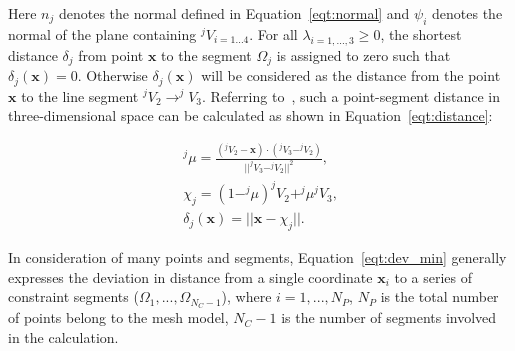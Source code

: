 Here $n_j$ denotes the normal defined in Equation~\ref{eqt:normal} and $\psi_i$ denotes the normal of the plane containing $^jV_{i=1...4}$.
For all $\lambda_{i=1,...,3} \ge 0$, the shortest distance $\delta_j$ from point $\textbf{x}$ to the segment $\Omega_j$ is assigned to zero such that $\delta_j(\textbf{x})=0$.
Otherwise $\delta_j(\textbf{x})$ will be considered as the distance from the point $\textbf{x}$ to the line segment $^jV_2 \rightarrow ^jV_3$.
Referring to~\cite{weisstein}, such a point-segment distance in three-dimensional space can be calculated as shown in Equation~\ref{eqt:distance}:

\begin{equation}
\begin{aligned}
^j\mu = \frac{(^jV_2-\textbf{x})\cdot(^jV_3-^jV_2)}{||^jV_3-^jV_2||^2} \mbox{,} \\
\chi_j = (1-^j\mu)^jV_2 + ^j\mu^jV_3 \mbox{,} \\
\delta_{j}(\textbf{x}) = ||\textbf{x}-\chi_j|| \mbox{.}
\end{aligned}
\label{eqt:distance}
\end{equation}

In consideration of many points and segments, Equation~\ref{eqt:dev_min} generally expresses the deviation in distance from a single coordinate $\textbf{x}_i$ to a series of constraint segments ($\Omega_{1},...,\Omega_{N_C-1}$), where $i=1,...,N_P$, $N_P$ is the total number of points belong to the mesh model, $N_C-1$ is the number of segments involved in the calculation.




